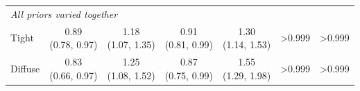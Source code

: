 {\begin{tabular}[t]{lcccccc}
\multicolumn{7}{l}{\textit{All priors varied together}}\\
\addlinespace
Tight & \makecell[c]{0.89\\(0.78, 0.97)} & \makecell[c]{1.18\\(1.07, 1.35)} & \makecell[c]{0.91\\(0.81, 0.99)} & \makecell[c]{1.30\\(1.14, 1.53)} & >0.999 & >0.999\\
\addlinespace
Diffuse & \makecell[c]{0.83\\(0.66, 0.97)} & \makecell[c]{1.25\\(1.08, 1.52)} & \makecell[c]{0.87\\(0.75, 0.99)} & \makecell[c]{1.55\\(1.29, 1.98)} & >0.999 & >0.999\\
\bottomrule
\end{tabular}%
}
